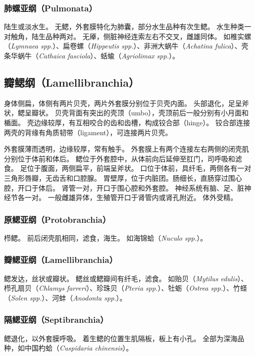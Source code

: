 \documentclass[11pt]{article}
\begin{document}
\subsubsection{肺螺亚纲（Pulmonata）}
陆生或淡水生。
无鳃，外套膜特化为肺囊，部分水生品种有次生鳃。
水生种类一对触角，陆生品种两对。
无厣，侧脏神经连索左右不交叉，雌雄同体。
如椎实螺（\textit{Lymnaea spp.}）、扁卷螺（\textit{Hippeutis spp.}）、非洲大蜗牛（\textit{Achatina fulica}）、壳条华蜗牛（\textit{Cathaica fasciola}）、蛞蝓（\textit{Agriolimax spp.}）。

\subsection{瓣鳃纲（Lamellibranchia）}
身体侧扁，体侧有两片贝壳，两片外套膜分别位于贝壳内面。
头部退化，足呈斧状，鳃呈瓣状。
贝壳背面有突出的壳顶（umbo），壳顶前后一般分别有小月面和楯面。
壳边缘较厚，有互相咬合的齿和齿槽，构成铰合部（hinge）。
铰合部连接两壳的背缘有角质韧带（ligament），可连接两片贝壳。

\newline

外套膜薄而透明，边缘较厚，常有触手。
外套膜上有两个连接左右两侧的闭壳肌分别位于体前和体后。
鳃位于外套腔中，从体前向后延伸至肛门，司呼吸和滤食。
足位于腹面，两侧扁平，前端呈斧状。
口位于体前，具纤毛，两侧各有一对三角形唇瓣，无齿舌和口腔腺。
胃壁厚，位于内脏团。肠细长，直肠穿过围心腔，开口于体后。
肾管一对，开口于围心腔和外套腔。
神经系统有脑、足、脏神经节各一对。
一般雌雄异体，生殖管开口于肾管内或肾孔附近。
体外受精。

\subsubsection{原鳃亚纲（Protobranchia）}
栉鳃。
前后闭壳肌相同，滤食，海生。
如海锦蛤（\textit{Nuculo spp.}）。

\subsubsection{瓣鳃亚纲（Lamellibranchia）}
鳃发达，丝状或瓣状。
鳃丝或鳃瓣间有纤毛，滤食。
如贻贝（\textit{Mytilus edulis}）、栉孔扇贝（\textit{Chlamys farreri}）、珍珠贝（\textit{Pteria spp.}）、牡蛎（\textit{Ostrea spp.}）、竹蛏（\textit{Solen spp.}）、河蚌（\textit{Anodonta spp.}）。

\subsubsection{隔鳃亚纲（Septibranchia）}
鳃退化，以外套膜呼吸。
着生鳃的位置生肌隔板，板上有小孔。
全部为深海品种，如中国杓蛤（\textit{Cuspidaria chinensis}）。
\end{document}
